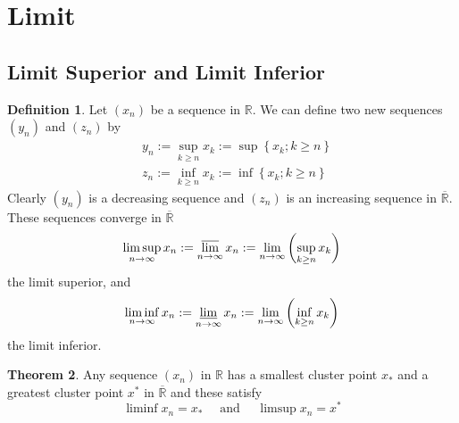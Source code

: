 \documentclass[12pt,a4paper]{book}
\theoremstyle{definition}
\newtheorem{defn}{Definition}[section]
\newtheorem{theo}[defn]{Theorem}
\begin{document}
\section{Limit}
\subsection{Limit Superior and Limit Inferior}
\begin{defn}
Let $\left(x_n\right)$ be a sequence in $\mathbb{R}$. We can define two new sequences $\left(y_n\right)$ and $\left(z_n\right)$ by
    $$
    \begin{aligned}
    & y_n:=\sup _{k \geq n} x_k:=\sup \left\{x_k ; k \geq n\right\} \\
    & z_n:=\inf _{k \geq n} x_k:=\inf \left\{x_k ; k \geq n\right\}
    \end{aligned}
    $$
    Clearly $\left(y_n\right)$ is a decreasing sequence and $\left(z_n\right)$ is an increasing sequence in $\overline{\mathbb{R}}$. These sequences converge in $\overline{\mathbb{R}}$  
    $$
    \limsup _{n \rightarrow \infty} x_n:=\varlimsup_{n \rightarrow \infty} x_n:=\lim _{n \rightarrow \infty}\left(\sup _{k \geq n} x_k\right)
    $$
    the limit superior, and
    $$
    \liminf_{n \rightarrow \infty} x_n:=\varliminf_{n \rightarrow \infty} x_n:=\lim _{n \rightarrow \infty}\left(\inf_{k \geq n} x_k\right)
    $$
    the limit inferior.
\end{defn}
\begin{theo}
    Any sequence $\left(x_n\right)$ in $\mathbb{R}$ has a smallest cluster point $x_*$ and a greatest cluster point $x^*$ in $\overline{\mathbb{R}}$ and these satisfy
    $$
    \liminf x_n=x_* \quad \text { and } \quad \limsup x_n=x^*
     $$
\end{theo}
\end{document}
